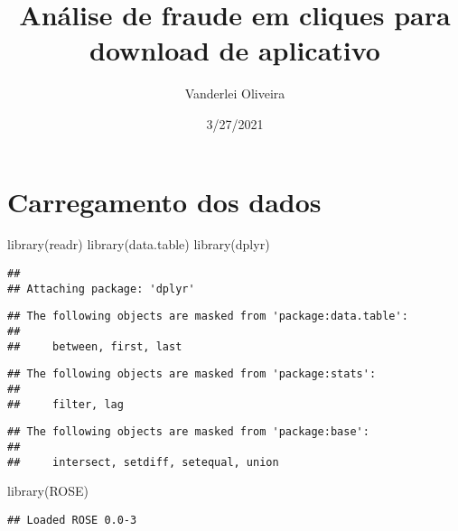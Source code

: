 \documentclass[
]{article}
\title{Análise de fraude em cliques para download de aplicativo}
\author{Vanderlei Oliveira}
\date{3/27/2021}
\newenvironment{Shaded}{\begin{snugshade}}{\end{snugshade}}
\newcommand{\AttributeTok}[1]{\textcolor[rgb]{0.77,0.63,0.00}{#1}}
\newcommand{\DecValTok}[1]{\textcolor[rgb]{0.00,0.00,0.81}{#1}}
\newcommand{\FunctionTok}[1]{\textcolor[rgb]{0.00,0.00,0.00}{#1}}
\newcommand{\NormalTok}[1]{#1}
\newcommand{\OtherTok}[1]{\textcolor[rgb]{0.56,0.35,0.01}{#1}}
\newcommand{\SpecialCharTok}[1]{\textcolor[rgb]{0.00,0.00,0.00}{#1}}
\newcommand{\StringTok}[1]{\textcolor[rgb]{0.31,0.60,0.02}{#1}}
\begin{document}
\maketitle

\hypertarget{carregamento-dos-dados}{%
\section{Carregamento dos dados}\label{carregamento-dos-dados}}

\begin{Shaded}
\begin{Highlighting}[]
\FunctionTok{library}\NormalTok{(readr)}
\FunctionTok{library}\NormalTok{(data.table)}
\FunctionTok{library}\NormalTok{(dplyr)}
\end{Highlighting}
\end{Shaded}

\begin{verbatim}
## 
## Attaching package: 'dplyr'
\end{verbatim}

\begin{verbatim}
## The following objects are masked from 'package:data.table':
## 
##     between, first, last
\end{verbatim}

\begin{verbatim}
## The following objects are masked from 'package:stats':
## 
##     filter, lag
\end{verbatim}

\begin{verbatim}
## The following objects are masked from 'package:base':
## 
##     intersect, setdiff, setequal, union
\end{verbatim}

\begin{Shaded}
\begin{Highlighting}[]
\FunctionTok{library}\NormalTok{(ROSE)}
\end{Highlighting}
\end{Shaded}

\begin{verbatim}
## Loaded ROSE 0.0-3
\end{verbatim}

\begin{Shaded}
\end{Shaded}
\end{document}
